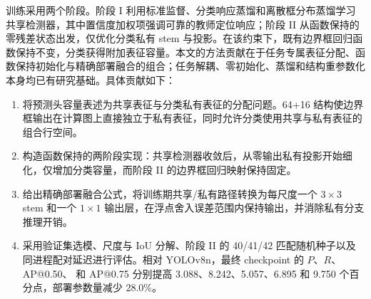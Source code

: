 训练采用两个阶段。阶段 I 利用标准监督、分类响应蒸馏和离散框分布蒸馏学习共享检测器\cite{zheng2022ld}，其中置信度加权项强调可靠的教师定位响应；阶段 II 从函数保持的零残差状态出发，仅优化分类私有 stem 与投影。在该约束下，既有边界框回归函数保持不变，分类获得附加表征容量。本文的方法贡献在于任务专属表征分配、函数保持初始化与精确部署融合的组合；任务解耦、零初始化、蒸馏和结构重参数化本身均已有研究基础。具体贡献如下：
\begin{enumerate}
\item 将预测头容量表述为共享表征与分类私有表征的分配问题。64+16 结构使边界框输出在计算图上直接独立于私有表征，同时允许分类使用共享与私有表征的组合行空间。
\item 构造函数保持的两阶段实现：共享检测器收敛后，从零输出私有投影开始细化，仅增加分类容量，而阶段 II 的边界框回归映射保持固定。
\item 给出精确部署融合公式，将训练期共享/私有路径转换为每尺度一个 $3\times3$ stem 和一个 $1\times1$ 输出层，在浮点舍入误差范围内保持输出，并消除私有分支推理开销。
\item 采用验证集选模、尺度与 IoU 分解、阶段 II 的 40/41/42 匹配随机种子以及同进程配对延迟进行评估。相对 YOLOv8n，最终 checkpoint 的 $P$、$R$、AP@0.50、\mapall{} 和 AP@0.75 分别提高 3.088、8.242、5.057、6.895 和 9.750 个百分点，部署参数量减少 28.0\%。
\end{enumerate}

